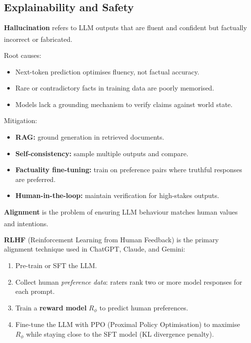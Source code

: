 \subsection{Explainability and Safety}

\begin{tcbitemize}[ skin=sectionraster ]

    \tcbitem[title=Hallucination in LLMs, raster multicolumn=3]
    \textbf{Hallucination} refers to LLM outputs that are fluent and confident but
    factually incorrect or
    fabricated.\textsuperscript{\cite[][p.~xii]{dhamaniIntroductionGenerativeAI2024}}

    Root causes:
    \begin{itemize}
        \item Next-token prediction optimises fluency, not factual accuracy.
        \item Rare or contradictory facts in training data are poorly memorised.
        \item Models lack a grounding mechanism to verify claims against world state.
    \end{itemize}

    Mitigation:
    \begin{itemize}
        \item \textbf{RAG:} ground generation in retrieved documents.
        \item \textbf{Self-consistency:} sample multiple outputs and compare.
        \item \textbf{Factuality fine-tuning:} train on preference pairs where truthful
              responses are preferred.
        \item \textbf{Human-in-the-loop:} maintain verification for high-stakes outputs.
    \end{itemize}

    \tcbitem[title={Alignment and RLHF}, raster multicolumn=3]
    \textbf{Alignment} is the problem of ensuring LLM behaviour matches human values and
    intentions.\textsuperscript{\cite[][p.~73]{farrisHowLargeLanguage2025}}

    \textbf{RLHF} (Reinforcement Learning from Human Feedback) is the primary alignment
    technique used in ChatGPT, Claude, and Gemini:

    \begin{enumerate}
        \item Pre-train or SFT the LLM.
        \item Collect human \emph{preference data}: raters rank two or more model
              responses for each prompt.
        \item Train a \textbf{reward model} $R_\phi$ to predict human preferences.
        \item Fine-tune the LLM with PPO (Proximal Policy Optimisation) to maximise
              $R_\phi$ while staying close to the SFT model (KL divergence penalty).
    \end{enumerate}


\end{tcbitemize}
